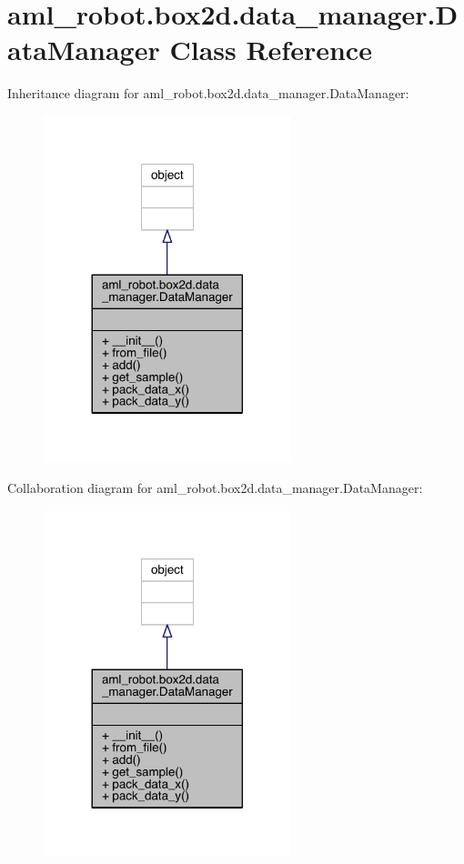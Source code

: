 \hypertarget{classaml__robot_1_1box2d_1_1data__manager_1_1_data_manager}{}\section{aml\+\_\+robot.\+box2d.\+data\+\_\+manager.\+Data\+Manager Class Reference}
\label{classaml__robot_1_1box2d_1_1data__manager_1_1_data_manager}


Inheritance diagram for aml\+\_\+robot.\+box2d.\+data\+\_\+manager.\+Data\+Manager\+:\nopagebreak
\begin{figure}[H]
\begin{center}
\leavevmode
\includegraphics[width=204pt]{classaml__robot_1_1box2d_1_1data__manager_1_1_data_manager__inherit__graph}
\end{center}
\end{figure}


Collaboration diagram for aml\+\_\+robot.\+box2d.\+data\+\_\+manager.\+Data\+Manager\+:\nopagebreak
\begin{figure}[H]
\begin{center}
\leavevmode
\includegraphics[width=204pt]{classaml__robot_1_1box2d_1_1data__manager_1_1_data_manager__coll__graph}
\end{center}
\end{figure}
